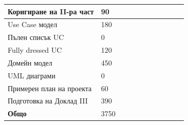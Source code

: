 \documentclass[a4paper]{article}
\begin{document}
\begin{table}[h]
\begin{tabular}{|l|l|l|l|l|l|l|l|l|l|l|}
\hline
Коригиране на II-ра част	& 90   	\\ \hline
Use Case модел				& 180  	\\ \hline
Пълен списък UC				& 0   	\\ \hline
Fully dressed UC			& 120  	\\ \hline
Домейн модел				& 450  	\\ \hline
UML диаграми				& 0   	\\ \hline
Примерен план на проекта	& 60   	\\ \hline
Подготовка на Доклад III	& 390  	\\ \hline
\textbf{Общо}				& 3750 	\\ \hline
\end{tabular}
\end{table}
\end{document}
